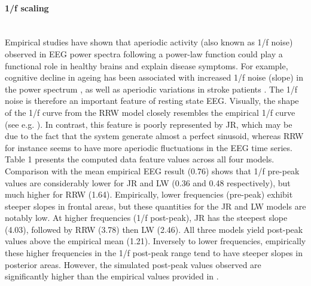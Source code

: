 \documentclass[12pt,twoside]{article}
\begin{document}
\paragraph{1/f scaling} ~\\
Empirical studies have shown that aperiodic activity (also known as 1/f noise) observed in EEG power spectra following a power-law function could play a functional role in healthy brains and explain disease symptoms. For example, cognitive decline in ageing has been associated with increased 1/f noise (slope) in the power spectrum \citep{voytek2015age}, as well as aperiodic variations in stroke patients \citep{johnston2023spectral}.
The 1/f noise is therefore an important feature of resting state EEG. Visually, the shape of the 1/f curve from the RRW model closely resembles the empirical 1/f curve (see e.g. \citet{freeman2003spatial, dehghani2010comparative}). In contrast, this feature is poorly represented by JR, which may be due to the fact that the system generate almost a perfect sinusoid, whereas RRW for instance seems to have more aperiodic fluctuations in the EEG time series.\\
Table 1 presents the computed data feature values across all four models. Comparison with the mean empirical EEG result (0.76) shows that 1/f pre-peak values are considerably lower for JR and LW (0.36 and 0.48 respectively), but much higher for RRW (1.64). Empirically, lower frequencies (pre-peak) exhibit steeper slopes in frontal areas, but these quantities for the JR and LW models are notably low.
At higher frequencies (1/f post-peak), JR has the steepest slope (4.03), followed by RRW (3.78) then LW (2.46). All three models yield post-peak values above the empirical mean (1.21). Inversely to lower frequencies, empirically these higher frequencies in the 1/f post-peak range tend to have steeper slopes in posterior areas. However, the simulated post-peak values observed are significantly higher than the empirical values provided in \citet{muthukumaraswamy20181}.
\end{document}
